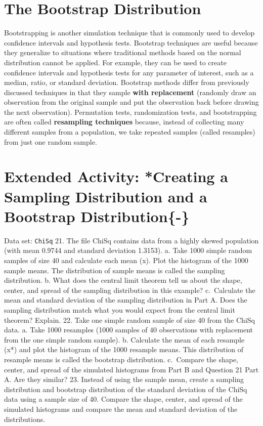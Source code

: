 \documentclass[
]{report}
\theoremstyle{definition}
\theoremstyle{definition}
\theoremstyle{definition}
\theoremstyle{definition}
\theoremstyle{remark}
\begin{document}
\hypertarget{the-bootstrap-distribution}{%
\section{\texorpdfstring{\textbf{The Bootstrap Distribution}}{The Bootstrap Distribution}}\label{the-bootstrap-distribution}}

\normalsize

Bootstrapping is another simulation technique that is commonly used to develop confidence intervals and
hypothesis tests. Bootstrap techniques are useful because they generalize to situations where traditional methods
based on the normal distribution cannot be applied. For example, they can be used to create confidence intervals
and hypothesis tests for any parameter of interest, such as a median, ratio, or standard deviation. Bootstrap
methods differ from previously discussed techniques in that they sample \textbf{with replacement} (randomly draw
an observation from the original sample and put the observation back before drawing the next observation).
\textbar{} Permutation tests, randomization tests, and bootstrapping are often called \textbf{resampling techniques}
because, instead of collecting many different samples from a population, we take repeated samples (called
resamples) from just one random sample.

\hypertarget{extended-activity-creating-a-sampling-distribution-and-a-bootstrap-distribution-}{%
\section{Extended Activity: *Creating a Sampling Distribution and a Bootstrap Distribution\{-\}}\label{extended-activity-creating-a-sampling-distribution-and-a-bootstrap-distribution-}}

Data set: \texttt{ChiSq}
21. The file ChiSq contains data from a highly skewed population (with mean 0.9744 and standard
deviation 1.3153).
a. Take 1000 simple random samples of size 40 and calculate each mean (x). Plot the histogram of the
1000 sample means. The distribution of sample means is called the sampling distribution.
b. What does the central limit theorem tell us about the shape, center, and spread of the sampling distribution
in this example?
c.~Calculate the mean and standard deviation of the sampling distribution in Part A. Does the sampling
distribution match what you would expect from the central limit theorem? Explain.
22. Take one simple random sample of size 40 from the ChiSq data.
a. Take 1000 resamples (1000 samples of 40 observations with replacement from the one simple
random sample).
b. Calculate the mean of each resample (x*) and plot the histogram of the 1000 resample means. This
distribution of resample means is called the bootstrap distribution.
c.~Compare the shape, center, and spread of the simulated histograms from Part B and Question
21 Part A. Are they similar?
23. Instead of using the sample mean, create a sampling distribution and bootstrap distribution of the standard
deviation of the ChiSq data using a sample size of 40. Compare the shape, center, and spread of
the simulated histograms and compare the mean and standard deviation of the distributions.
\end{document}
